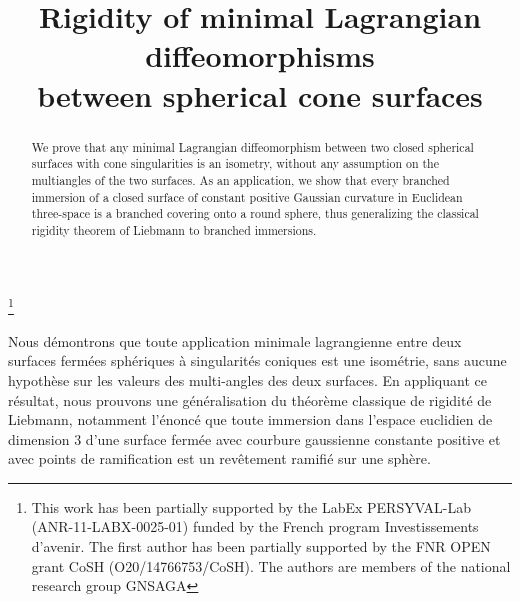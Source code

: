 \documentclass[JEP,XML,SOM,Unicode,NoEqCountersInSection,published]{cedram}
\theoremstyle{definition}
\begin{document}
\frontmatter
\title[Rigidity of minimal Lagrangian diffeomorphisms]{Rigidity of minimal Lagrangian diffeomorphisms\\ between spherical cone surfaces}

\author[\initial{C.} \lastname{El Emam}]{ }
\address{Université du Luxembourg, Maison du Nombre,\\
6 Avenue de la Fonte,
L-4364 Esch-sur-Alzette, Luxembourg}

\author[\initial{A.} \lastname{Seppi}]{ }
\address{Institut Fourier, UMR 5582, Laboratoire de Mathématiques,
Université Grenoble Alpes\\
CS 40700, 38058 Grenoble cedex 9, France}

\thanks{This work has been partially supported by the LabEx PERSYVAL-Lab (ANR-11-LABX-0025-01) funded by the French program Investissements d'avenir. The first author has been partially supported by the FNR OPEN grant CoSH (O20/14766753/CoSH). The authors are members of the national research group GNSAGA}

\begin{abstract}
We prove that any minimal Lagrangian diffeomorphism between two closed spherical surfaces with cone singularities is an isometry, without any assumption on the multiangles of the two surfaces. As an application, we show that every branched immersion of a closed surface of constant positive Gaussian curvature in Euclidean three-space is a branched covering onto a round sphere, thus generalizing the classical rigidity theorem of Liebmann to branched immersions.
\end{abstract}





\begin{altabstract}
Nous démontrons que toute application minimale lagrangienne entre deux surfaces fermées sphériques à singularités coniques est une isométrie, sans aucune hypothèse sur les valeurs des multi-angles des deux surfaces. En appliquant ce résultat, nous prouvons une généralisation du théorème classique de rigidité de Liebmann, notamment l’énoncé que toute immersion dans l’espace euclidien de dimension $3$ d’une surface fermée avec courbure gaussienne constante positive et avec points de ramification est un revêtement ramifié sur une sphère.
\end{altabstract}
\end{document}
